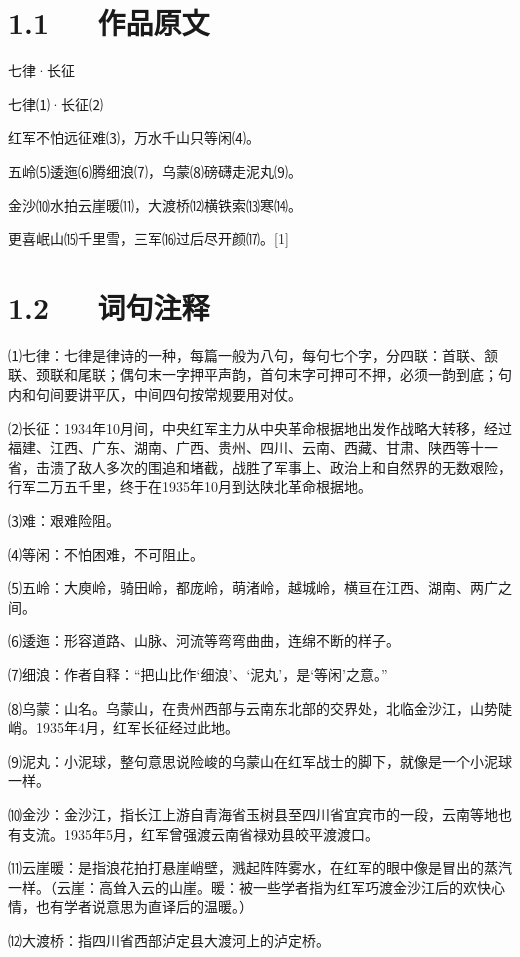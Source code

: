 \documentclass[letterpaper,10pt,english]{sphinxmanual}
\begin{document}
\section{1.1   作品原文}
\label{\detokenize{p01_u6563_u6587/_u6bdb_u6cfd_u4e1c-_u4e03_u5f8b_xb7_u957f_u5f81:id3}}
七律·长征

七律⑴·长征⑵

红军不怕远征难⑶，万水千山只等闲⑷。

五岭⑸逶迤⑹腾细浪⑺，乌蒙⑻磅礴走泥丸⑼。

金沙⑽水拍云崖暖⑾，大渡桥⑿横铁索⒀寒⒁。

更喜岷山⒂千里雪，三军⒃过后尽开颜⒄。{[}1{]}


\section{1.2   词句注释}
\label{\detokenize{p01_u6563_u6587/_u6bdb_u6cfd_u4e1c-_u4e03_u5f8b_xb7_u957f_u5f81:id4}}
⑴七律：七律是律诗的一种，每篇一般为八句，每句七个字，分四联：首联、颔联、颈联和尾联；偶句末一字押平声韵，首句末字可押可不押，必须一韵到底；句内和句间要讲平仄，中间四句按常规要用对仗。

⑵长征：1934年10月间，中央红军主力从中央革命根据地出发作战略大转移，经过福建、江西、广东、湖南、广西、贵州、四川、云南、西藏、甘肃、陕西等十一省，击溃了敌人多次的围追和堵截，战胜了军事上、政治上和自然界的无数艰险，行军二万五千里，终于在1935年10月到达陕北革命根据地。

⑶难：艰难险阻。

⑷等闲：不怕困难，不可阻止。

⑸五岭：大庾岭，骑田岭，都庞岭，萌渚岭，越城岭，横亘在江西、湖南、两广之间。

⑹逶迤：形容道路、山脉、河流等弯弯曲曲，连绵不断的样子。

⑺细浪：作者自释：“把山比作‘细浪’、‘泥丸’，是‘等闲’之意。”

⑻乌蒙：山名。乌蒙山，在贵州西部与云南东北部的交界处，北临金沙江，山势陡峭。1935年4月，红军长征经过此地。

⑼泥丸：小泥球，整句意思说险峻的乌蒙山在红军战士的脚下，就像是一个小泥球一样。

⑽金沙：金沙江，指长江上游自青海省玉树县至四川省宜宾市的一段，云南等地也有支流。1935年5月，红军曾强渡云南省禄劝县皎平渡渡口。

⑾云崖暖：是指浪花拍打悬崖峭壁，溅起阵阵雾水，在红军的眼中像是冒出的蒸汽一样。（云崖：高耸入云的山崖。暖：被一些学者指为红军巧渡金沙江后的欢快心情，也有学者说意思为直译后的温暖。）

⑿大渡桥：指四川省西部泸定县大渡河上的泸定桥。
\end{document}
